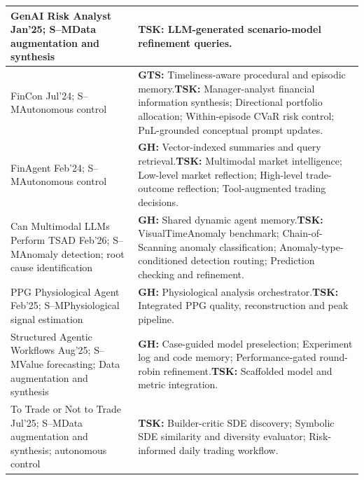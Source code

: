 \documentclass[preprints,article,submit,moreauthors]{Definitions/mdpi}
\newcommand{\typeSMshort}{\textsf{S--M}}
\begin{document}
\begin{longtable}{@{}>{\raggedright\arraybackslash}p{}p{}@{}}
GenAI Risk Analyst \citep{joshi2025using} Jan'25; \typeSMshort{}\newline Data augmentation and synthesis & \textbf{TSK:} LLM-generated scenario-model refinement queries.\\\midrule
FinCon \citep{fincon2024} Jul'24; \typeSMshort{}\newline Autonomous control & \textbf{GTS:} Timeliness-aware procedural and episodic memory.\newline\textbf{TSK:} Manager-analyst financial information synthesis; Directional portfolio allocation; Within-episode CVaR risk control; PnL-grounded conceptual prompt updates.\\\midrule
FinAgent \citep{finagent2024} Feb'24; \typeSMshort{}\newline Autonomous control & \textbf{GH:} Vector-indexed summaries and query retrieval.\newline\textbf{TSK:} Multimodal market intelligence; Low-level market reflection; High-level trade-outcome reflection; Tool-augmented trading decisions.\\\midrule
Can Multimodal LLMs Perform TSAD \citep{multimodaltsad2026} Feb'26; \typeSMshort{}\newline Anomaly detection; root cause identification & \textbf{GH:} Shared dynamic agent memory.\newline\textbf{TSK:} VisualTimeAnomaly benchmark; Chain-of-Scanning anomaly classification; Anomaly-type-conditioned detection routing; Prediction checking and refinement.\\\midrule
PPG Physiological Agent \citep{physiologicalagent2025} Feb'25; \typeSMshort{}\newline Physiological signal estimation & \textbf{GH:} Physiological analysis orchestrator.\newline\textbf{TSK:} Integrated PPG quality, reconstruction and peak pipeline.\\\midrule
Structured Agentic Workflows \citep{structuredagenticworkflows2025} Aug'25; \typeSMshort{}\newline Value forecasting; Data augmentation and synthesis & \textbf{GH:} Case-guided model preselection; Experiment log and code memory; Performance-gated round-robin refinement.\newline\textbf{TSK:} Scaffolded model and metric integration.\\\midrule
To Trade or Not to Trade \citep{tradetonottrade2025} Jul'25; \typeSMshort{}\newline Data augmentation and synthesis; autonomous control & \textbf{TSK:} Builder-critic SDE discovery; Symbolic SDE similarity and diversity evaluator; Risk-informed daily trading workflow.\\\midrule

\end{longtable}
\end{document}

